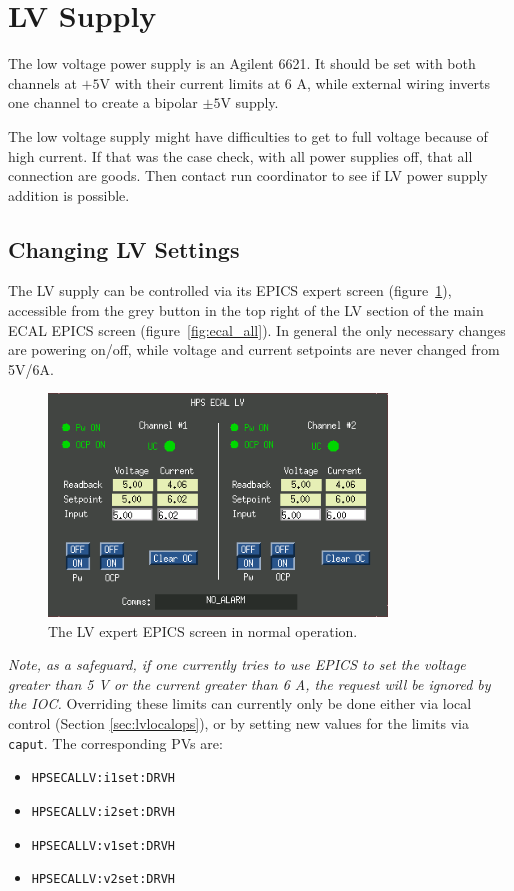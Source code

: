 \documentclass[12pt]{article}
\begin{document}
\newpage
   \section{LV Supply}
      The low voltage power supply is an Agilent 6621.  It should be set with both channels at $+5$V with their current limits at 6 A, while external wiring inverts one channel to create a bipolar $\pm5$V supply. 

      The low voltage supply might have difficulties to get to full voltage because of high current. If that was the case check, with all power supplies off, that all connection are goods. Then contact run coordinator to see if LV power supply addition is possible. 

\subsection{Changing LV Settings}
The LV supply can be controlled via its EPICS expert screen (figure~\ref{lvexpert}), accessible from the grey button in the top right of the LV section of the main ECAL EPICS screen (figure~\ref{fig:ecal_all}). In general the only necessary changes are powering on/off, while voltage and current setpoints are never changed from 5V/6A.
\begin{figure}[htbp]\centering
    \includegraphics[width=9cm]{pics/lvexpert}
    \caption{The LV expert EPICS screen in normal operation.\label{lvexpert}}
\end{figure}

{\em Note, as a safeguard, if one currently tries to use EPICS to set the voltage greater than 5 V or the current greater than 6 A, the request will be ignored by the IOC.}  Overriding these limits can currently only be done either via local control (Section \ref{sec:lvlocalops}), or by setting new values for the limits via \texttt{caput}.  The corresponding PVs are:
{\footnotesize
\begin{itemize}
    \item\texttt{HPSECALLV:i1set:DRVH}
    \item\texttt{HPSECALLV:i2set:DRVH}
    \item\texttt{HPSECALLV:v1set:DRVH}
    \item\texttt{HPSECALLV:v2set:DRVH}
\end{itemize}
}
\end{document}
